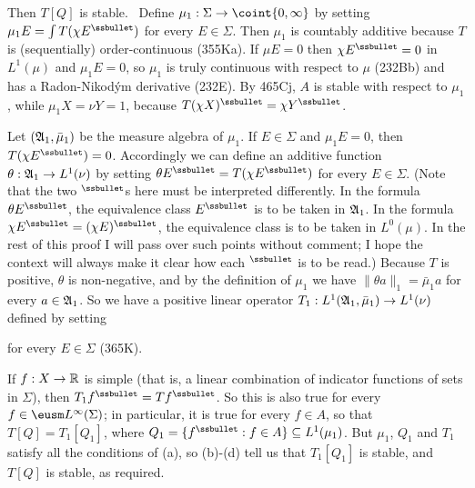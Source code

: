 {

\noindent Then $T[Q]$ is stable.   \Prf\ Define
$\mu_1:\Sigma\to\coint{0,\infty}$ by setting
$\mu_1E=\int T(\chi E^{\ssbullet})$ for every $E\in\Sigma$.   Then
$\mu_1$ is countably
additive because $T$ is (sequentially) order-continuous (355Ka).   If
$\mu E=0$ then $\chi E^{\ssbullet}=0$ in $L^1(\mu)$ and $\mu_1E=0$, so
$\mu_1$ is truly continuous with respect to $\mu$ (232Bb) and has a
Radon-Nikod\'ym derivative (232E).   By 465Cj, $A$ is stable with
respect to $\mu_1$, while $\mu_1X=\nu Y=1$, because
$T(\chi X)^{\ssbullet}=\chi Y^{\ssbullet}$.

Let $(\frak A_1,\bar\mu_1)$ be the measure algebra of $\mu_1$.   If
$E\in\Sigma$ and $\mu_1E=0$, then $T(\chi E^{\ssbullet})=0$.
Accordingly we can define an additive function
$\theta:\frak A_1\to L^1(\nu)$ by setting
$\theta E^{\ssbullet}=T(\chi E^{\ssbullet})$ for
every $E\in\Sigma$.   (Note that the two $^{\ssbullet}$s here must be
interpreted differently.   In the formula $\theta E^{\ssbullet}$, the
equivalence class $E^{\ssbullet}$ is to be taken in $\frak A_1$.   In
the formula $\chi E^{\ssbullet}=(\chi E)^{\ssbullet}$, the equivalence
class is to be taken in $L^0(\mu)$.   In the rest of this proof I will
pass over such points without comment;  I hope the context will always
make it clear how each $^{\ssbullet}$ is to be read.)
Because $T$ is positive, $\theta$ is non-negative, and by the definition
of $\mu_1$ we have $\|\theta a\|_1=\bar\mu_1a$ for every
$a\in\frak A_1$.   So we have a positive linear operator
$T_1:L^1(\frak A_1,\bar\mu_1)\to L^1(\nu)$ defined by setting


\noindent for every $E\in\Sigma$ (365K).

If $f:X\to\Bbb R$ is simple (that is, a linear combination of
indicator functions of sets in $\Sigma$), then
$T_1f^{\ssbullet}=Tf^{\ssbullet}$.   So this is also true for every
$f\in\eusm L^{\infty}(\Sigma)$;  in particular, it is true for every
$f\in A$, so that $T[Q]=T_1[Q_1]$, where
$Q_1=\{f^{\ssbullet}:f\in A\}\subseteq L^1(\mu_1)$.   But $\mu_1$, $Q_1$
and $T_1$ satisfy all the
conditions of (a), so (b)-(d) tell us that $T_1[Q_1]$ is stable, and
$T[Q]$ is stable, as required.\ \Qed

}
